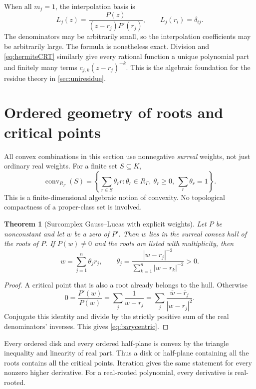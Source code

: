 \documentclass[11pt,letterpaper,oneside]{article}
\numberwithin{equation}{section}
\newtheorem{theorem}{Theorem}[section]
\theoremstyle{definition}
\theoremstyle{remark}\newtheorem{remark}[theorem]{Remark}
\newcommand{\conv}{\operatorname{conv}}\newcommand{\Bez}{\operatorname{Bez}}
\begin{document}
When all $m_j=1$, the interpolation basis is
\[
 L_j(z)=\frac{P(z)}{(z-r_j)P'(r_j)},\qquad L_j(r_i)=\delta_{ij}.
\]
The denominators may be arbitrarily small, so the interpolation coefficients
may be arbitrarily large. The formula is nonetheless exact. Division and
\eqref{eq:hermiteCRT} similarly give every rational function a unique
polynomial part and finitely many terms $c_{j,k}(z-r_j)^{-k}$. This is the
algebraic foundation for the residue theory in \cref{sec:uniresidue}.

\section{Ordered geometry of roots and critical points}\label{sec:geometry}
All convex combinations in this section use nonnegative \emph{surreal}
weights, not just ordinary real weights. For a finite set $S\subseteq K$,
\[
 \conv_{R_\Gamma}(S)=
 \left\{\sum_{r\in S}\theta_r r:
    \theta_r\in R_\Gamma,\ \theta_r\geq0,\ \sum_r\theta_r=1\right\}.
\]
This is a finite-dimensional algebraic notion of convexity. No topological
compactness of a proper-class set is involved.

\begin{theorem}[Surcomplex Gauss--Lucas with explicit weights]\label{thm:gausslucas}
Let $P$ be nonconstant and let $w$ be a zero of $P'$. Then $w$ lies in the
surreal convex hull of the roots of $P$. If $P(w)\ne0$ and the roots are
listed with multiplicity, then
\begin{equation}\label{eq:barycentric}
 w=\sum_{j=1}^n\theta_j r_j,
 \qquad
 \theta_j=\frac{|w-r_j|^{-2}}{\sum_{k=1}^n|w-r_k|^{-2}}>0.
\end{equation}
\end{theorem}
\begin{proof}
A critical point that is also a root already belongs to the hull. Otherwise
\[
 0=\frac{P'(w)}{P(w)}=\sum_j\frac1{w-r_j}
 =\sum_j\frac{\overline w-\overline r_j}{|w-r_j|^2}.
\]
Conjugate this identity and divide by the strictly positive sum of the
real denominators' inverses. This gives \eqref{eq:barycentric}.
\end{proof}

Every ordered disk and every ordered half-plane is convex by the triangle
inequality and linearity of real part. Thus a disk or half-plane containing
all the roots contains all the critical points. Iteration gives the same
statement for every nonzero higher derivative. For a real-rooted polynomial,
every derivative is real-rooted.
\end{document}
